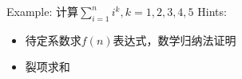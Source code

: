 \clearpage
Example: 计算$\sum_{i=1}^n i^k, k=1,2,3,4,5$  
\clearpage
Hints:
\begin{itemize}
\item 待定系数求$f(n)$表达式，数学归纳法证明
\item 裂项求和
\end{itemize}



